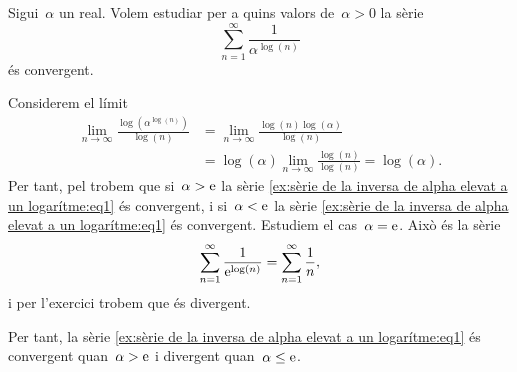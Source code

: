 \documentclass[../../main.tex]{subfiles}
\begin{document}
    \begin{example}
        \label{ex:sèrie de la inversa de alpha elevat a un logarítme}
        Sigui~\(\alpha\) un real.
        Volem estudiar per a quins valors de~\(\alpha>0\) la sèrie
        \begin{equation}
            \label{ex:sèrie de la inversa de alpha elevat a un logarítme:eq1}
            \sum_{n=1}^{\infty}\frac{1}{\alpha^{\log(n)}}
        \end{equation}
        és convergent.
    \end{example}
    \begin{solution}
        Considerem el límit
        \begin{align*}
            \lim_{n\to\infty}\frac{\log\left(\alpha^{\log(n)}\right)}{\log(n)}&=\lim_{n\to\infty}\frac{\log(n)\log(\alpha)}{\log(n)} \\
            &=\log(\alpha)\lim_{n\to\infty}\frac{\log(n)}{\log(n)}=\log(\alpha).
        \end{align*}
        Per tant, pel  trobem que si~\(\alpha>\mathrm{e}\) la sèrie \eqref{ex:sèrie de la inversa de alpha elevat a un logarítme:eq1} és convergent, i si~\(\alpha<\mathrm{e}\) la sèrie \eqref{ex:sèrie de la inversa de alpha elevat a un logarítme:eq1} és convergent.
        Estudiem el cas~\(\alpha=\mathrm{e}\).
        Això és la sèrie
        \[
            \sum_{n=1}^{\infty}\frac{1}{\mathrm{e}^{\log(n)}}=\sum_{n=1}^{\infty}\frac{1}{n},
        \]
        i per l'exercici  trobem que és divergent.

        Per tant, la sèrie \eqref{ex:sèrie de la inversa de alpha elevat a un logarítme:eq1} és convergent quan~\(\alpha>\mathrm{e}\) i divergent quan~\(\alpha\leq\mathrm{e}\).
    \end{solution}
\end{document}
